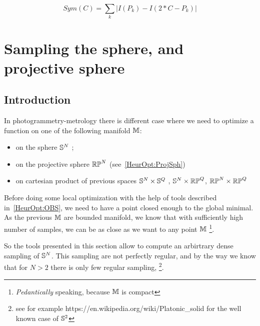 \begin{equation}
   Sym(C) = \sum_k |I(P_k) - I(2*C-P_k)| \label{ImSym:HeuristikOpt}
\end{equation}


\section{Sampling the sphere, and projective sphere}

\label{Sec:Samp:Sphere}

\subsection{Introduction}

In photogrammetry-metrology there is different case where we need to
optimize a function on one of the following manifold $\mathbb{M}$:

\begin{itemize}
   \item on the sphere $\mathbb{S}^N$ ;
   \item on the projective sphere  $\mathbb{RP}^N$ (see~\ref{HeurOpt:ProjSph})
   \item on cartesian product of previous spaces $\mathbb{S}^N \times \mathbb{S}^Q $ ,  
         $\mathbb{S}^N \times \mathbb{RP}^Q $, $\mathbb{RP}^N \times \mathbb{RP}^Q $
\end{itemize}

Before doing some local optimization with the help of tools
described in~\ref{HeurOpt:OBS}, we need to have a point closed
enough to the global minimal.  As the previous $\mathbb{M}$  are
bounded manifold, we know that with sufficiently high number  of samples,
we can be as close as we want to any point $\mathbb{M}$ 
\footnote{\emph{Pedantically} speaking, because $\mathbb{M}$ is compact}.

So the tools presented in this section allow to compute an arbirtrary
dense sampling of $\mathbb{S}^N$. This sampling are not perfectly regular,
and by the way we know that for $N>2$ there is only few regular 
sampling, \footnote{see for example https://en.wikipedia.org/wiki/Platonic\_solid
for the well known case of $\mathbb{S}^2$}.

